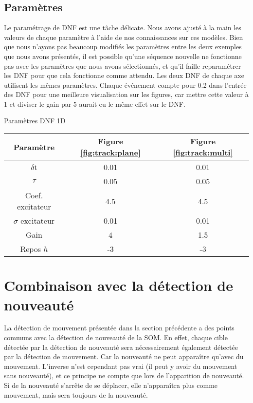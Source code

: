 	\subsection{Paramètres}

	Le paramétrage de DNF est une tâche délicate. Nous avons ajusté à la main les valeurs de chaque paramètre à l'aide de nos connaissances sur ces modèles. Bien que nous n'ayons pas beaucoup modifiés les paramètres entre les deux exemples que nous avons présentés, il est possible qu'une séquence nouvelle ne fonctionne pas avec les paramètres que nous avons sélectionnés, et qu'il faille reparamétrer les DNF pour que cela fonctionne comme attendu. Les deux DNF de chaque axe utilisent les mêmes paramètres. Chaque événement compte pour 0.2 dans l'entrée des DNF pour une meilleure visualisation sur les figures, car mettre cette valeur à 1 et diviser le gain par 5 aurait eu le même effet sur le DNF.


	\begin{tableth}
	\label{tab:recap:param}
	\caption[Paramètres DNF 1D]{Paramètres DNF 1D}
	\begin{tabular}{|c|cc|}
		\hline
		Paramètre & Figure \ref{fig:track:plane} & Figure \ref{fig:track:multi}\\
		\hline
		$\delta$t & 0.01 & 0.01\\
		$\tau$ & 0.05 & 0.05\\
		Coef. excitateur & 4.5 & 4.5\\
		$\sigma$ excitateur & 0.01 & 0.01\\
		Gain & 4 & 1.5\\
		Repos $h$ & -3 & -3\\
		\hline
	\end{tabular}
	\end{tableth}

	\newpage

	\section{Combinaison avec la détection de nouveauté}

	La détection de mouvement présentée dans la section précédente a des points communs avec la détection de nouveauté de la SOM. En effet, chaque cible détectée par la détection de nouveauté sera nécessairement également détectée par la détection de mouvement. Car la nouveauté ne peut apparaître qu'avec du mouvement. L'inverse n'est cependant pas vrai (il peut y avoir du mouvement sans nouveauté), et ce principe ne compte que lors de l'apparition de nouveauté. Si de la nouveauté s'arrête de se déplacer, elle n'apparaîtra plus comme mouvement, mais sera toujours de la nouveauté.

